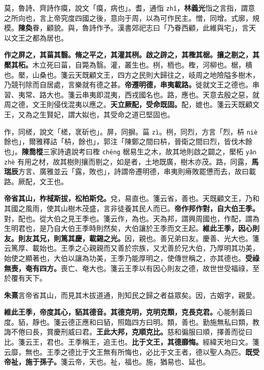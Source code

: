\begin{quoting}莫，魯詩、齊詩作瘼，說文「瘼，病也」。耆，通恉 \texttt{zhǐ}，\textbf{林義光}恉之言指，謂意之所向也，言上帝究度四國之後，意向于周，以為可作民主。憎，同增。式廓，規模。\textbf{陳奐}眷，顧貌。與，魯詩作予。漢書郊祀志曰「乃眷西顧，此維與宅」，言天以文王之都為居也。\end{quoting}

\textbf{作之屏之，其菑其翳。脩之平之，其灌其栵。啟之辟之，其檉其椐。攘之剔之，其檿其柘。}{\footnotesize 木立死曰菑，自斃為翳。灌，叢生也。栵，栭也。檉，河柳也。椐，樻也。檿，山桑也。箋云天既顧文王，四方之民則大歸往之，岐周之地險隘多樹木，乃競刊除而自居處，言樂就有德之甚。}\textbf{帝遷明德，串夷載路。}{\footnotesize 徙就文王之德也。串習、夷常、路大也。箋云串夷即混夷，西戎國名也。路，應也。天意去殷之惡，就周之德，文王則侵伐混夷以應之。}\textbf{天立厥配，受命既固。}{\footnotesize 配，媲也。箋云天既顧文王，又為之生賢妃，謂大姒也，其受命之道已堅固也。}

\begin{quoting}作，同槎，說文「槎，衺斫也」。屏，同摒。菑 \texttt{zì}。栵，同烈，方言「烈，枿 \texttt{niè} 餘也」，爾雅釋詁「枿，餘也」，郭注「陳鄭之間曰枿，晉衛之間曰烈，皆伐木餘也」。\textbf{陳喬樅}三家詩遺說考曰檉 \texttt{chēng} 椐易生之木，故其地則啟之闢之，檿柘 \texttt{yǎn zhè} 有用之材，故其樹則攘而剔之，如是者，土地既廣，樹木亦茂。路，同露，\textbf{馬瑞辰}方言、廣雅並云「露，敗也」，詩謂帝遷明德，串夷則瘠敗罷憊而去，故曰載路。厥配，文王也。\end{quoting}

\textbf{帝省其山，柞棫斯拔，松柏斯兌。}{\footnotesize 兌，易直也。箋云省，善也。天既顧文王，乃和其國之風雨，使其山樹木茂盛，言非徒養其民人而已。}\textbf{帝作邦作對，自大伯王季。}{\footnotesize 對，配也。從大伯之見王季也。箋云作，為也。天為邦，謂興周國也，作配，謂為生明君也，是乃自大伯王季時則然矣，大伯讓於王季而文王起。}\textbf{維此王季，因心則友。則友其兄，則篤其慶，載錫之光。}{\footnotesize 因，親也。善兄弟曰友。慶善、光大也。箋云篤厚、載始也。王季之心親親而又善於宗族，又尤善於兄大伯，乃厚明其功美，始使之顯著也，大伯以讓為功美，王季乃能厚明之，使傳世稱之，亦其德也。}\textbf{受祿無喪，奄有四方。}{\footnotesize 喪亡、奄大也。箋云王季以有因心則友之德，故世世受福祿，至於覆有天下。}

\begin{quoting}\textbf{朱熹}言帝省其山，而見其木拔道通，則知民之歸之者益眾矣。因，古姻字，親愛。\end{quoting}

\textbf{維此王季，帝度其心，貊其德音。其德克明，克明克類，克長克君。}{\footnotesize 心能制義曰度。貊，靜也。箋云德正應和曰貊，照臨四方曰明。類，善也。勤施無私曰類，教誨不倦曰長，賞慶刑威曰君。}\textbf{王此大邦，克順克比。}{\footnotesize 慈和徧服曰順，擇善而從曰比。箋云王，君也。王季稱王，追王也。}\textbf{比于文王，其德靡悔。}{\footnotesize 經緯天地曰文。箋云靡，無也。王季之德比于文王無有所悔也，必比于文王者，德以聖人為匹。}\textbf{既受帝祉，施于孫子。}{\footnotesize 箋云帝，天也。祉，福也。施，猶易也、延也。}

